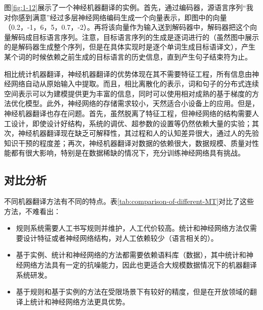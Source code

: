 \parinterval 图\ref{fig:1-12}展示了一个神经机器翻译的实例。首先，通过编码器，源语言序列``我对你感到满意''经过多层神经网络编码生成一个向量表示，即图中的向量（0.2，-1，6，5，0.7，-2）。再将该向量作为输入送到解码器中，解码器把这个向量解码成目标语言序列。注意，目标语言序列的生成是逐词进行的（虽然图中展示的是解码器生成整个序列，但是在具体实现时是逐个单词生成目标语译文），产生某个词的时候依赖之前生成的目标语言的历史信息，直到产生句子结束符为止。

\parinterval 相比统计机器翻译，神经机器翻译的优势体现在其不需要特征工程，所有信息由神经网络自动从原始输入中提取。而且，相比离散化的表示，词和句子的分布式连续空间表示可以为建模提供更为丰富的信息，同时可以使用相对成熟的基于梯度的方法优化模型。此外，神经网络的存储需求较小，天然适合小设备上的应用。但是，神经机器翻译也存在问题。首先，虽然脱离了特征工程，但神经网络的结构需要人工设计，即使设计好结构，系统的调优、超参数的设置等仍然依赖大量的实验；其次，神经机器翻译现在缺乏可解释性，其过程和人的认知差异很大，通过人的先验知识干预的程度差；再次，神经机器翻译对数据的依赖很大，数据规模、质量对性能都有很大影响，特别是在数据稀缺的情况下，充分训练神经网络具有挑战。


\subsection{对比分析}

\parinterval 不同机器翻译方法有不同的特点。表\ref{tab:comparison-of-different-MT}对比了这些方法，不难看出：

\begin{itemize}
\vspace{0.5em}
\item 规则系统需要人工书写规则并维护，人工代价较高。统计和神经网络方法仅需要设计特征或者神经网络结构，对人工依赖较少（语言相关的）。
\vspace{0.5em}
\item 基于实例、统计和神经网络的方法都需要依赖语料库（数据），其中统计和神经网络方法具有一定的抗噪能力，因此也更适合大规模数据情况下的机器翻译系统研发。
\vspace{0.5em}
\item 基于规则和基于实例的方法在受限场景下有较好的精度，但是在开放领域的翻译上统计和神经网络方法更具优势。
\vspace{0.5em}
\end{itemize}

